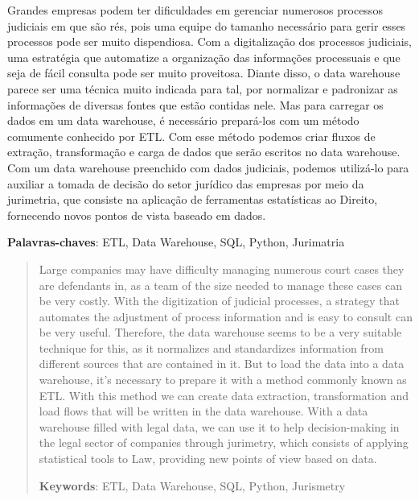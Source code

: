 \begin{resumo}
    Grandes empresas podem ter dificuldades em gerenciar numerosos processos judiciais em que são rés, pois uma equipe do tamanho necessário para gerir esses processos pode ser muito dispendiosa. Com a digitalização dos processos judiciais, uma estratégia que automatize a organização das informações processuais e que seja de fácil consulta pode ser muito proveitosa. Diante disso, o data warehouse parece ser uma técnica muito indicada para tal, por normalizar e padronizar as informações de diversas fontes que estão contidas nele. Mas para carregar os dados em um data warehouse, é necessário prepará-los com um método comumente conhecido por ETL. Com esse método podemos criar fluxos de extração, transformação e carga de dados que serão escritos no data warehouse. Com um data warehouse preenchido com dados judiciais, podemos utilizá-lo para auxiliar a tomada de decisão do setor jurídico das empresas por meio da jurimetria, que consiste na aplicação de ferramentas estatísticas ao Direito, fornecendo novos pontos de vista baseado em dados.

    \hfill

    \textbf{Palavras-chaves}: ETL, Data Warehouse, SQL, Python, Jurimatria

\end{resumo}

\begin{abstract}
  Large companies may have difficulty managing numerous court cases they are defendants in, as a team of the size needed to manage these cases can be very costly. With the digitization of judicial processes, a strategy that automates the adjustment of process information and is easy to consult can be very useful. Therefore, the data warehouse seems to be a very suitable technique for this, as it normalizes and standardizes information from different sources that are contained in it. But to load the data into a data warehouse, it's necessary to prepare it with a method commonly known as ETL. With this method we can create data extraction, transformation and load flows that will be written in the data warehouse. With a data warehouse filled with legal data, we can use it to help decision-making in the legal sector of companies through jurimetry, which consists of applying statistical tools to Law, providing new points of view based on data.
  
  \hfill

    \textbf{Keywords}: ETL, Data Warehouse, SQL, Python, Jurismetry

\end{abstract}